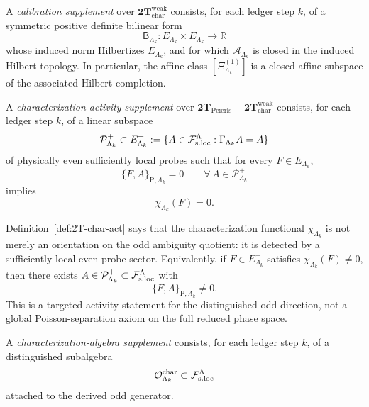 \begin{definition}
\label{def:2T-char-cal}
A \emph{calibration supplement} over
\(\mathbf{2T}_{\mathrm{char}}^{\mathrm{weak}}\) consists, for each ledger step \(k\),
of a symmetric positive definite bilinear form
  \[
  \mathsf B_{\Lambda_k}:E^-_{\Lambda_k}\times E^-_{\Lambda_k}\to\mathbb R
  \]
  whose induced norm Hilbertizes \(E^-_{\Lambda_k}\), and for which
  \(\mathcal A^-_{\Lambda_k}\) is closed in the induced Hilbert topology. In particular, the affine
  class \([\Xi^{(1)}_{\Lambda_k}]\) is a closed affine subspace of the associated
  Hilbert completion.
\end{definition}

\begin{definition}
\label{def:2T-char-act}
A \emph{characterization-activity supplement} over
\(\mathbf{2T}_{\mathrm{Peierls}}+\mathbf{2T}_{\mathrm{char}}^{\mathrm{weak}}\) consists,
for each ledger step \(k\), of a linear subspace
\[
\mathcal P^+_{\Lambda_k}
\subset
E^+_{\Lambda_k}
:=
\{A\in\mathcal F_{\mathrm{s.loc}}^\Lambda:\Gamma_{\Lambda_k}A=A\}
\]
of physically even sufficiently local probes such that for every
\(F\in E^-_{\Lambda_k}\),
\[
\{F,A\}_{\mathrm P,\Lambda_k}=0
\qquad
\forall\,A\in\mathcal P^+_{\Lambda_k}
\]
implies
\[
\chi_{\Lambda_k}(F)=0.
\]
\end{definition}

\begin{remark}
\label{rem:2T-char-act-reading}
Definition~\ref{def:2T-char-act} says that the characterization functional
\(\chi_{\Lambda_k}\) is not merely an orientation on the odd ambiguity quotient:
it is detected by a sufficiently local even probe sector.
Equivalently, if \(F\in E^-_{\Lambda_k}\) satisfies
\(\chi_{\Lambda_k}(F)\neq 0\), then there exists
\(A\in\mathcal P^+_{\Lambda_k}\subset\mathcal F_{\mathrm{s.loc}}^\Lambda\) with
\[
\{F,A\}_{\mathrm P,\Lambda_k}\neq 0.
\]
This is a targeted activity statement for the distinguished odd direction, not a
global Poisson-separation axiom on the full reduced phase space.
\end{remark}

\begin{definition}
\label{def:2T-alg}
A \emph{characterization-algebra supplement} consists, for each
ledger step \(k\), of a distinguished subalgebra
\[
\mathcal O^{\mathrm{char}}_{\Lambda_k}\subset \mathcal F_{\mathrm{s.loc}}^\Lambda
\]
attached to the derived odd generator.
\end{definition}

